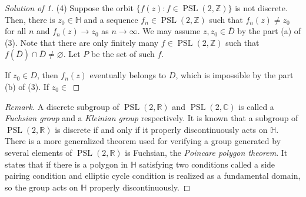 \documentclass[a4paper]{article}
\theoremstyle{definition}
\renewcommand{\H}{\mathbb{H}}
\newcommand{\C}{\mathbb{C}}
\newcommand{\R}{\mathbb{R}}
\newcommand{\Z}{\mathbb{Z}}
\newcommand{\PSL}{\operatorname{PSL}}
\renewcommand{\bar}{\overline}
\begin{document}
\begin{proof}[Solution of 1]
(4)
Suppose the orbit $\{f(z):f\in\PSL(2,\Z)\}$ is not discrete.
Then, there is $z_0\in\H$ and a sequence $f_n\in\PSL(2,\Z)$ such that $f_n(z)\ne z_0$ for all $n$ and $f_n(z)\to z_0$ as $n\to\infty$.
We may assume $z,z_0\in\bar D$ by the part (a) of (3).
Note that there are only finitely many $f\in\PSL(2,\Z)$ such that $f(\bar D)\cap\bar D\ne\varnothing$.
Let $P$ be the set of such $f$.


If $z_0\in D$, then $f_n(z)$ eventually belongs to $D$, which is impossible by the part (b) of (3).
If $z_0\in$

\end{proof}

\begin{proof}[Remark]
A discrete subgroup of $\PSL(2,\R)$ and $\PSL(2,\C)$ is called a \emph{Fuchsian group} and a \emph{Kleinian group} respectively.
It is known that a subgroup of $\PSL(2,\R)$ is discrete if and only if it properly discontinuously acts on $\H$.
There is a more generalized theorem used for verifying a group generated by several elements of $\PSL(2,\R)$ is Fuchsian, the \emph{Poincare polygon theorem}.
It states that if there is a polygon in $\H$ satisfying two conditions called a side pairing condition and elliptic cycle condition is realized as a fundamental domain, so the group acts on $\H$ properly discontinuously.
\end{proof}
\end{document}
